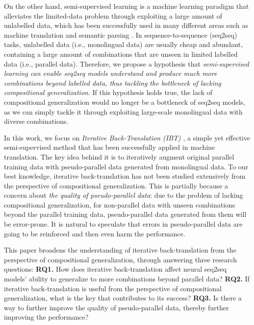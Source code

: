 \documentclass[letterpaper]{article} %
\begin{document}
On the other hand, semi-supervised learning \cite{chapelle2009semi} is a machine learning paradigm that alleviates the limited-data problem through exploiting a large amount of unlabelled data, which has been successfully used in many different areas such as machine translation \cite{sennrich2016improving,he2016dual,skorokhodov2018semi} and semantic parsing \cite{yin2018structvae,cao2019semantic}.
In sequence-to-sequence (seq2seq) tasks, unlabelled data (i.e., monolingual data) are usually cheap and abundant, containing a large amount of combinations that are unseen in limited labelled data (i.e., parallel data).
Therefore, we propose a hypothesis that \emph{semi-supervised learning can enable seq2seq models understand and produce much more combinations beyond labelled data, thus tackling the bottleneck of lacking compositional generalization}.
If this hypothesis holds true, the lack of compositional generalization would no longer be a bottleneck of seq2seq models, as we can simply tackle it through exploiting large-scale monolingual data with diverse combinations.

In this work, we focus on \emph{Iterative Back-Translation (IBT)} \cite{hoang2018iterative}, a simple yet effective semi-supervised method that has been successfully applied in machine translation.
The key idea behind it is to iteratively augment original parallel training data with pseudo-parallel data generated from monolingual data.
To our best knowledge, iterative back-translation has not been studied extensively from the perspective of compositional generalization.
This is partially because a concern about \emph{the quality of pseudo-parallel data}:
due to the problem of lacking compositional generalization, for non-parallel data with unseen combinations beyond the parallel training data, pseudo-parallel data generated from them will be error-prone.
It is natural to speculate that errors in pseudo-parallel data are going to be reinforced and then even harm the performance.

This paper broadens the understanding of iterative back-translation from the perspective of compositional generalization, through answering three research questions:
\textbf{RQ1. } How does iterative back-translation affect neural seq2seq models' ability to generalize to more combinations beyond parallel data?
\textbf{RQ2. } If iterative back-translation is useful from the perspective of compositional generalization, what is the key that contributes to its success?
\textbf{RQ3. } Is there a way to further improve the quality of pseudo-parallel data, thereby further improving the performance?
\end{document}
